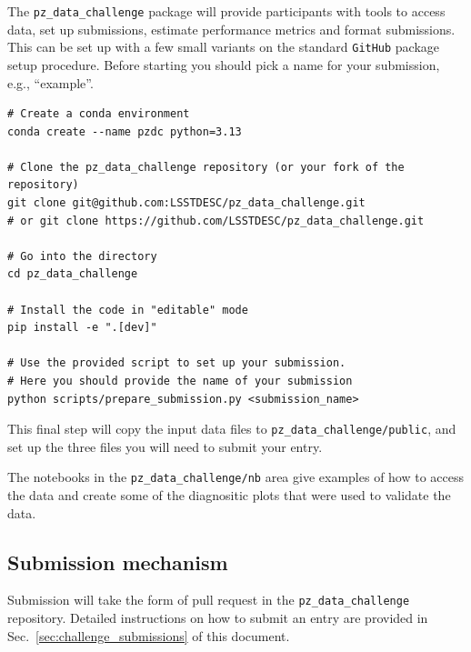 The \texttt{pz\_data\_challenge} package will provide participants with tools
to access data, set up submissions, estimate performance metrics and
format submissions.  This can be set up with a few small
variants on the standard \texttt{GitHub} package setup procedure.
Before starting you should pick a name for your submission, e.g., ``example''.

\begin{verbatim}
# Create a conda environment
conda create --name pzdc python=3.13

# Clone the pz_data_challenge repository (or your fork of the repository)
git clone git@github.com:LSSTDESC/pz_data_challenge.git
# or git clone https://github.com/LSSTDESC/pz_data_challenge.git

# Go into the directory
cd pz_data_challenge

# Install the code in "editable" mode
pip install -e ".[dev]"

# Use the provided script to set up your submission.
# Here you should provide the name of your submission
python scripts/prepare_submission.py <submission_name>
\end{verbatim}

This final step will copy the input data files to
\texttt{pz\_data\_challenge/public}, and set up the three files you will
need to submit your entry.

The notebooks in the \texttt{pz\_data\_challenge/nb} area give examples
of how to access the data and create some of the diagnositic plots
that were used to validate the data.


\subsection{Submission mechanism}

Submission will take the form of pull request in the
\texttt{pz\_data\_challenge} repository.  Detailed instructions on how
to submit an entry are provided in
Sec.~\ref{sec:challenge_submissions} of this document.

